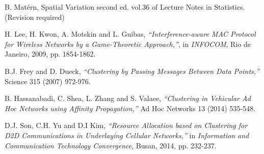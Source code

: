 \documentclass[10pt, conference, letterpaper]{IEEEtran}
\begin{document}
\begin{thebibliography}{50}
B. Mat\'ern, Spatial Variation second ed. vol.36 of Lecture Notes in Statistics. (Revision required)

H. Lee, H. Kwon, A. Motskin and  L. Guibas, \emph{``Interference-aware MAC Protocol for Wireless Networks by a Game-Theoretic Approach,''}, in \emph{INFOCOM}, Rio de Janeiro, 2009, pp. 1854-1862.

B.J. Frey and D. Dueck, \emph{``Clustering by Passing Messages Between Data Points,''} Science 315 (2007) 972-976.

B. Hassanabadi, C. Shea, L. Zhang and S. Valaee, \emph{``Clustering in Vehicular Ad Hoc Networks using Affinity Propagation,''} Ad Hoc Networks 13 (2014) 535-548.

D.J. Son, C.H. Yu and D.I Kim, \emph{``Resource Allocation based on Clustering for D2D Communications in Underlaying Cellular Networks,''} in \emph{Information and Communication Technology Convergence}, Busan, 2014, pp. 232-237.

\end{thebibliography}
\end{document}
